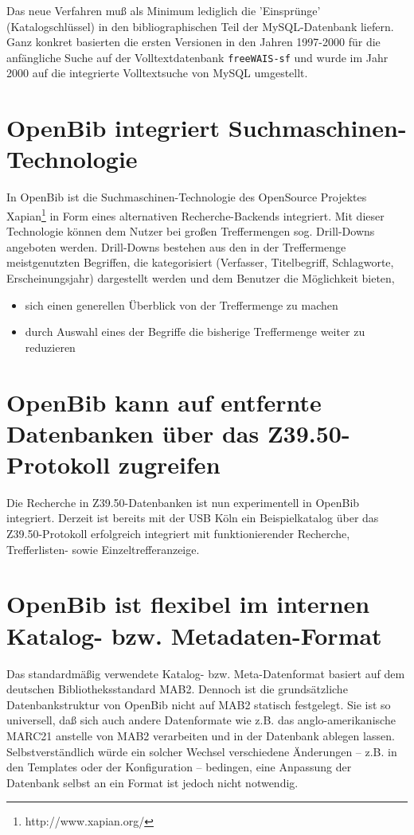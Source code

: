 \documentclass[11pt, twoside, a4paper, BCOR8mm, DIV12, bibtotoc,idxtotoc]{scrbook}
\begin{document}
Das neue Verfahren muß als Minimum lediglich die 'Einsprünge'
(Katalogschlüssel) in den biblio\-gra\-phi\-schen Teil der MySQL-Datenbank
liefern. Ganz konkret basierten die ersten Versionen in den Jahren
1997-2000 für die anfängliche Suche auf der Volltextdatenbank
\texttt{freeWAIS-sf} und wurde im Jahr 2000 auf die integrierte
Volltextsuche von MySQL umgestellt.


\section{OpenBib integriert Suchmaschinen-Technologie}
In OpenBib ist die Suchmaschinen-Technologie des OpenSource Projektes
Xapian\footnote{http://www.xapian.org/} in Form eines alternativen
Recherche-Backends integriert. Mit dieser Technologie können dem Nutzer bei
großen Treffermengen sog. Drill-Downs angeboten werden. Drill-Downs
bestehen aus den in der Treffermenge meistgenutzten Begriffen, die
kategorisiert (Verfasser, Titelbegriff, Schlagworte, Erscheinungsjahr)
dargestellt werden und dem Benutzer die Möglichkeit bieten,
\begin{itemize}
\item sich einen generellen Überblick von der Treffermenge zu machen
\item durch Auswahl eines der Begriffe die bisherige Treffermenge
  weiter zu reduzieren 
\end{itemize}


\section{OpenBib kann auf entfernte Datenbanken über das Z39.50-Protokoll zugreifen}

Die Recherche in Z39.50-Datenbanken ist nun experimentell in OpenBib
integriert. Derzeit ist bereits mit der USB Köln ein Beispielkatalog
über das Z39.50-Protokoll erfolgreich integriert mit funktionierender
Recherche, Trefferlisten- sowie Einzeltrefferanzeige.

\section{OpenBib ist flexibel im internen Katalog- bzw. Metadaten-Format}
Das standardmäßig verwendete Katalog- bzw. Meta-Datenformat basiert
auf dem deutschen Bibliotheksstandard MAB2. Dennoch ist die
grundsätzliche Datenbankstruktur von OpenBib nicht auf MAB2 statisch
festgelegt. Sie ist so universell, daß sich auch andere Datenformate
wie z.B. das anglo-amerikanische MARC21 anstelle von MAB2 verarbeiten
und in der Datenbank ablegen lassen. Selbstverständlich würde ein
solcher Wechsel verschiedene Änderungen -- z.B. in den Templates oder
der Konfiguration -- bedingen, eine Anpassung der Datenbank selbst an
ein Format ist jedoch nicht notwendig.
\end{document}
